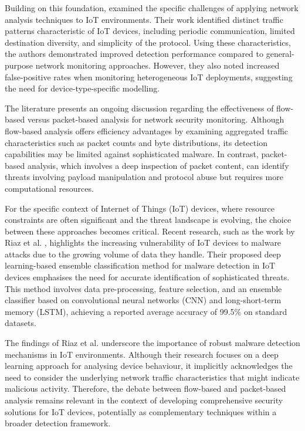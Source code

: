 Building on this foundation, \cite{Diro2018} examined the specific challenges of applying network analysis techniques to IoT environments. Their work identified distinct traffic patterns characteristic of IoT devices, including periodic communication, limited destination diversity, and simplicity of the protocol. Using these characteristics, the authors demonstrated improved detection performance compared to general-purpose network monitoring approaches. However, they also noted increased false-positive rates when monitoring heterogeneous IoT deployments, suggesting the need for device-type-specific modelling.

The literature presents an ongoing discussion regarding the effectiveness of flow-based versus packet-based analysis for network security monitoring. Although flow-based analysis offers efficiency advantages by examining aggregated traffic characteristics such as packet counts and byte distributions, its detection capabilities may be limited against sophisticated malware. In contrast, packet-based analysis, which involves a deep inspection of packet content, can identify threats involving payload manipulation and protocol abuse but requires more computational resources.

For the specific context of Internet of Things (IoT) devices, where resource constraints are often significant and the threat landscape is evolving, the choice between these approaches becomes critical. Recent research, such as the work by Riaz et al. \cite{riaz2022malware}, highlights the increasing vulnerability of IoT devices to malware attacks due to the growing volume of data they handle. Their proposed deep learning-based ensemble classification method for malware detection in IoT devices emphasises the need for accurate identification of sophisticated threats. This method involves data pre-processing, feature selection, and an ensemble classifier based on convolutional neural networks (CNN) and long-short-term memory (LSTM), achieving a reported average accuracy of 99.5\% on standard datasets.

The findings of Riaz et al. \cite{riaz2022malware} underscore the importance of robust malware detection mechanisms in IoT environments. Although their research focuses on a deep learning approach for analysing device behaviour, it implicitly acknowledges the need to consider the underlying network traffic characteristics that might indicate malicious activity. Therefore, the debate between flow-based and packet-based analysis remains relevant in the context of developing comprehensive security solutions for IoT devices, potentially as complementary techniques within a broader detection framework.

